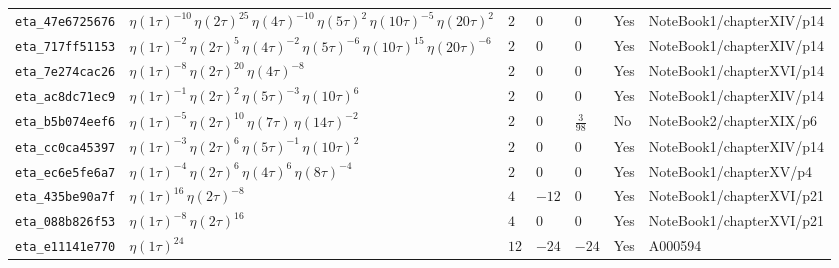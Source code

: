 \documentclass[11pt,twoside,openright]{book}
\begin{document}
\begin{longtable}{p{2.3cm}p{4.3cm}llllp{2.3cm}}
\texttt{eta\_47e6725676} & $\eta(1\tau)^{-10}\, \eta(2\tau)^{25}\, \eta(4\tau)^{-10}\, \eta(5\tau)^{2}\, \eta(10\tau)^{-5}\, \eta(20\tau)^{2}$ & $2$ & $0$ & $0$ & Yes & NoteBook1/chapterXIV/p14 \\
\texttt{eta\_717ff51153} & $\eta(1\tau)^{-2}\, \eta(2\tau)^{5}\, \eta(4\tau)^{-2}\, \eta(5\tau)^{-6}\, \eta(10\tau)^{15}\, \eta(20\tau)^{-6}$ & $2$ & $0$ & $0$ & Yes & NoteBook1/chapterXIV/p14 \\
\texttt{eta\_7e274cac26} & $\eta(1\tau)^{-8}\, \eta(2\tau)^{20}\, \eta(4\tau)^{-8}$ & $2$ & $0$ & $0$ & Yes & NoteBook1/chapterXVI/p14 \\
\texttt{eta\_ac8dc71ec9} & $\eta(1\tau)^{-1}\, \eta(2\tau)^{2}\, \eta(5\tau)^{-3}\, \eta(10\tau)^{6}$ & $2$ & $0$ & $0$ & Yes & NoteBook1/chapterXIV/p14 \\
\texttt{eta\_b5b074eef6} & $\eta(1\tau)^{-5}\, \eta(2\tau)^{10}\, \eta(7\tau)\, \eta(14\tau)^{-2}$ & $2$ & $0$ & $\frac{3}{98}$ & No & NoteBook2/chapterXIX/p6 \\
\texttt{eta\_cc0ca45397} & $\eta(1\tau)^{-3}\, \eta(2\tau)^{6}\, \eta(5\tau)^{-1}\, \eta(10\tau)^{2}$ & $2$ & $0$ & $0$ & Yes & NoteBook1/chapterXIV/p14 \\
\texttt{eta\_ec6e5fe6a7} & $\eta(1\tau)^{-4}\, \eta(2\tau)^{6}\, \eta(4\tau)^{6}\, \eta(8\tau)^{-4}$ & $2$ & $0$ & $0$ & Yes & NoteBook1/chapterXV/p4 \\
\texttt{eta\_435be90a7f} & $\eta(1\tau)^{16}\, \eta(2\tau)^{-8}$ & $4$ & $-12$ & $0$ & Yes & NoteBook1/chapterXVI/p21 \\
\texttt{eta\_088b826f53} & $\eta(1\tau)^{-8}\, \eta(2\tau)^{16}$ & $4$ & $0$ & $0$ & Yes & NoteBook1/chapterXVI/p21 \\
\texttt{eta\_e11141e770} & $\eta(1\tau)^{24}$ & $12$ & $-24$ & $-24$ & Yes & A000594 \\
\bottomrule
\end{longtable}
\end{document}
